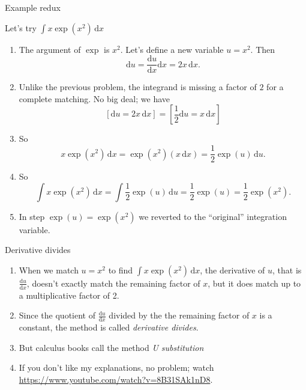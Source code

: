 \documentclass[fleqn]{beamer}
\theoremstyle{definition}
\newenvironment{checklist}{
  \begin{enumerate}[\ding{51}]
    \addtolength{\itemsep}{-0.0\itemsep}}
  {\end{enumerate}}
\begin{document}
\begin{frame}{Example redux}

Let's try  \(\int x  \exp(x^2) \, \mathrm{d} x \)

\begin{checklist}
\item  The argument of \(\exp\) is \(x^2\).  Let's define a new variable \(u = x^2\).   Then
\[
    \mathrm{d} u = \frac{\mathrm{d} u}{\mathrm{d} x} \mathrm{d} x = 2 x  \, \mathrm{d} x.
\]


\item  Unlike the previous problem, the integrand is missing a factor of \(2\) for a complete matching.  No big deal; we have
\[
  [\mathrm{d} u  =  2 x  \, \mathrm{d} x ]  =   \left [\frac{1}{2} \mathrm{d} u  =  x  \, \mathrm{d} x \right ] 
\]



\item So  
\[
    x  \exp(x^2) \, \mathrm{d} x   = \exp(x^2)     (x \,  \mathrm{d} x  ) = \frac{1}{2} \exp(u) \, \mathrm{d} u.
\]
\item So
\[
   \int x  \exp(x^2) \, \mathrm{d} x   = \int   \frac{1}{2} \exp(u) \, \mathrm{d} u =   \frac{1}{2} \exp(u)=  \frac{1}{2} \exp(x^2).
\]
\item In step   \(\exp(u) = \exp(x^2) \) we reverted to the ``original'' integration variable.

\end{checklist}

\end{frame}


\begin{frame}{Derivative divides}

\begin{checklist}

\item When we match \(u = x^2\) to find \( \int  x  \exp(x^2) \, \mathrm{d} x \),  the derivative of \(u\), that is  
\(\frac{\mathrm{d} u}{\mathrm{d} x}\), doesn't exactly match the remaining factor
of \(x\),   but it does match up to a multiplicative  factor of 2.

\item Since the quotient of  \(\frac{\mathrm{d} u}{\mathrm{d} x} \)  divided by the  the remaining factor of \(x\) is a constant, the method is called \emph{derivative divides}.

\item But calculus books call the method  \emph{U substitution}

\item If you don't like my explanations, no problem; watch  \url{https://www.youtube.com/watch?v=8B31SAk1nD8}.

\end{checklist}
\end{frame}
\end{document}
